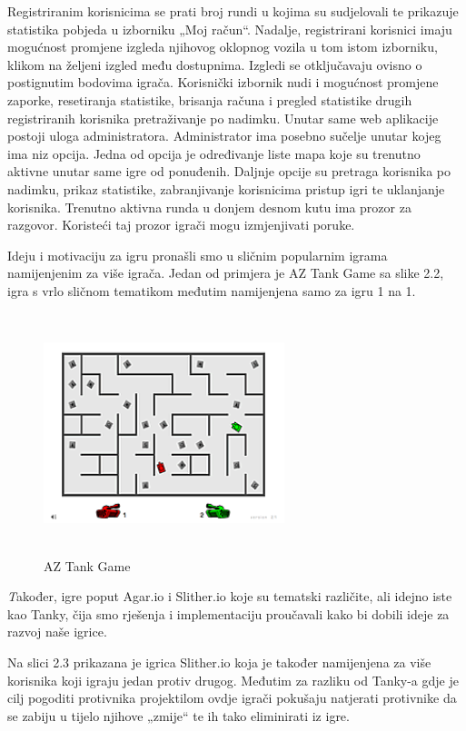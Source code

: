 Registriranim korisnicima se prati broj rundi u kojima su sudjelovali te prikazuje statistika pobjeda u izborniku „Moj račun“. Nadalje, registrirani korisnici imaju mogućnost promjene izgleda njihovog oklopnog vozila u tom istom izborniku, klikom na željeni izgled među dostupnima. Izgledi se otključavaju ovisno o postignutim bodovima igrača. Korisnički izbornik nudi i mogućnost promjene zaporke, resetiranja statistike, brisanja računa i pregled statistike drugih registriranih korisnika pretraživanje po nadimku.
Unutar same web aplikacije postoji uloga administratora. Administrator ima posebno sučelje unutar kojeg ima niz opcija. Jedna od opcija je određivanje liste mapa koje su trenutno aktivne unutar same igre od ponuđenih. Daljnje opcije su pretraga korisnika po nadimku, prikaz statistike, zabranjivanje korisnicima pristup igri te uklanjanje korisnika.
Trenutno aktivna runda u donjem desnom kutu ima prozor za razgovor. Koristeći taj prozor igrači mogu izmjenjivati poruke. 

Ideju i motivaciju za igru pronašli smo u sličnim popularnim igrama namijenjenim za više igrača. Jedan od primjera je AZ Tank Game sa slike 2.2, igra s vrlo sličnom tematikom međutim namijenjena samo za igru 1 na 1. \\

\begin{figure}[h]
	\centering
	\includegraphics[width=7cm,height=7cm]{AZtankGame}
	\caption{AZ Tank Game}
	\label{fig:opis}
\end{figure}



\textit Također, igre poput Agar.io i Slither.io koje su tematski različite, ali idejno iste kao Tanky, čija smo rješenja i implementaciju proučavali kako bi dobili ideje za razvoj naše igrice.

Na slici 2.3 prikazana je igrica Slither.io koja je također namijenjena za više korisnika koji igraju jedan protiv drugog. Međutim za razliku od Tanky-a gdje je cilj pogoditi protivnika projektilom ovdje igrači pokušaju natjerati protivnike da se zabiju u tijelo njihove „zmije“ te ih tako eliminirati iz igre.

